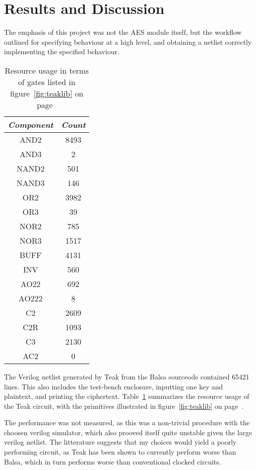 \section{Results and Discussion}

The emphasis of this project was not the AES module itself, but the
workflow outlined for specifying behaviour at a high level, and
obtaining a netlist correctly implementing the specified
behaviour.

\begin{table}[h]
  \centering
  \begin{tabular}{|c|c|}
    \hline
    \emph{Component}  & \emph{Count} \\ \hline
    AND2 & 8493 \\
    AND3 & 2 \\
    NAND2 & 501 \\
    NAND3 & 146 \\
    OR2 & 3982 \\
    OR3 & 39 \\
    NOR2 & 785 \\ 
    NOR3 & 1517 \\
    BUFF & 4131 \\
    INV & 560 \\
    AO22 & 692 \\
    AO222 & 8 \\
    C2 & 2609 \\
    C2R & 1093 \\
    C3  & 2130 \\
    AC2 & 0 \\
    \hline
  \end{tabular}
  \caption{Resource usage in terms of gates listed in
    figure~\ref{fig:teaklib} on page~\pageref{fig:teaklib}}
  \label{tab:res}
\end{table}

The Verilog netlist generated by Teak from the Balsa sourceode
contained 65421 lines. This also includes the test-bench enclosure,
inputting one key and plaintext, and printing the
ciphertext. Table~\ref{tab:res} summarizes the resource usage of the
Teak circuit, with the primitives illustrated in
figure~\ref{fig:teaklib} on page~\pageref{fig:teaklib}.

The performance was not measured, as this was a non-trivial procedure
with the choosen verilog simulator, which also prooved itself quite
unstable given the large verilog netlist. The litterature suggests
that my choices would yield a poorly performing circuit, as Teak has
been shown to currently perform worse than Balsa, which in turn
performs worse than conventional clocked circuits.

